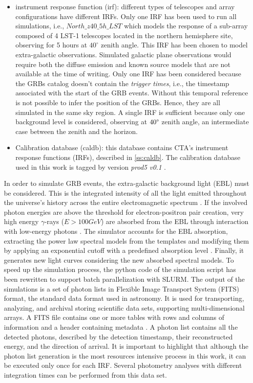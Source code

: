 \begin{itemize}
    \item instrument response function (irf): different types of telescopes and array configurations have different IRFs. Only one IRF has been used to run all simulations, i.e., $North\_z40\_5h\_LST$ which models the response of a sub-array composed of 4 LST-1 telescopes located in the northern hemisphere site, observing for 5 hours at $40^{\circ}$ zenith angle. This IRF has been chosen to model extra-galactic observations. Simulated galactic plane observations would require both the diffuse emission and known source models that are not available at the time of writing. Only one IRF has been considered because the GRBs catalog doesn't contain the \textit{trigger times}, i.e., the timestamp associated with the start of the GRB events. Without this temporal reference is not possible to infer the position of the GRBs. Hence, they are all simulated in the same sky region. A single IRF is sufficient because only one background level is considered, observing at $40\degree$  zenith angle, an intermediate case between the zenith and the horizon.
    \item Calibration database (caldb): this database contains CTA's instrument response functions (IRFs), described in \autoref{ss:caldb}. The calibration database used in this work is tagged by version \textit{prod5 v0.1} \cite{zenodo_2021}.
\end{itemize}
In order to simulate GRB events, the extra-galactic background light (EBL) must be considered. This is the integrated intensity of all the light emitted throughout the universe's history across the entire electromagnetic spectrum \cite{Cooray_2016}. 
If the involved photon energies are above the threshold for electron-positron pair creation, very high energy $\gamma$-rays ($E >100 GeV$) are absorbed from the EBL through interaction with low-energy photons \cite{Mazin_2013}. The simulator \cite{dipiano2022ctasagsci} accounts for the EBL absorption, extracting the power law spectral models from the templates and modifying them by applying an exponential cutoff with a predefined absorption level \cite{Gilmore_2012}. Finally, it generates new light curves considering the new absorbed spectral models. 
To speed up the simulation process, the python code of the simulation script has been rewritten to support batch parallelization with SLURM. The output of the simulations is a set of photon lists in Flexible Image Transport System (FITS) format, the standard data format used in astronomy. It is used for transporting, analyzing, and archival storing scientific data sets, supporting multi-dimensional arrays. A FITS file contains one or more tables with rows and columns of information and a header containing metadata \cite{fitswebsite}. A photon list contains all the detected photons, described by the detection timestamp, their reconstructed energy, and the direction of arrival.
It is important to highlight that although the photon list generation is the most resources intensive process in this work, it can be executed only once for each IRF. Several photometry analyses with different integration times can be performed from this data set.


